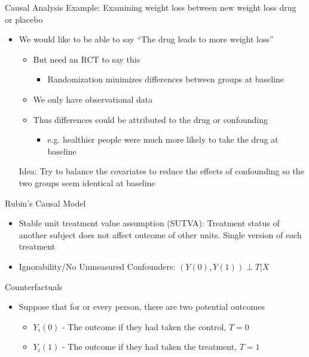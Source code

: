 \begin{frame}{Causal Analysis}
Example: Examining weight loss between new weight loss drug or placebo
 \begin{itemize}
  \item We would like to be able to say ``The drug leads to more weight loss''
  \begin{itemize}
   \item But need an RCT to say this
   \begin{itemize}
    \item Randomization minimizes differences between groups at baseline
   \end{itemize}

   \item We only have observational data
   \item Thus differences could be attributed to the drug or confounding
   
   \begin{itemize}
    \item e.g. healthier people were much more likely to take the drug at baseline
   \end{itemize}

  \end{itemize}
Idea: Try to balance the covariates to reduce the effects of confounding
so the two groups seem identical at baseline
 \end{itemize}
\end{frame}

\begin{frame}{Rubin's Causal Model}
\begin{itemize}
\item Stable unit treatment value assumption (SUTVA): Treatment status of another subject does not affect outcome of other units. Single version of each treatment
\item Ignorability/No Unmeasured Confounders: $(Y(0),Y(1))\perp T|X$
\end{itemize}
\end{frame}


\begin{frame}{Counterfactuals}
\begin{itemize}
 \item Suppose that for or every person, there are two potential outcomes
 \begin{itemize}
  \item $Y_i(0)$ - The outcome if they had taken the control, $T=0$
  \item $Y_i(1)$ - The outcome if they had taken the treatment, $T=1$
 \end{itemize}
  \end{itemize}
\end{frame}




